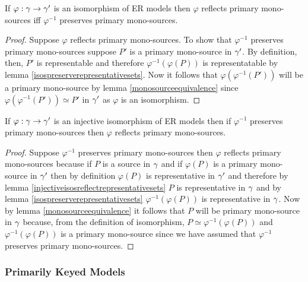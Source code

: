 \begin{lemma}
If $\varphi: \gamma \rightarrow \gamma'$ is an isomorphism of ER models  then
$\varphi$ reflects primary mono-sources iff $\varphi^{-1}$ preserves primary mono-sources.
\end{lemma}
\begin{proof}
Suppose $\varphi$ reflects primary mono-sources. To show that $\varphi^{-1}$ preserves primary mono-sources suppose
 $P'$ is a primary mono-source in $\gamma'$. By definition, then,  $P'$ is representable  and therefore $\varphi^{-1}(\varphi(P))$ is representatable 
by lemma \ref{isospreserverepresentativesets}.  Now it follows that  $\varphi(\varphi^{-1}(P'))$ will be a primary mono-source by lemma \ref{monosourceequivalence} since $\varphi(\varphi^{-1}(P')) \simeq P'$ in $\gamma'$ as $\varphi$ is an isomorphism. 
\end{proof}

\begin{lemma}
If $\varphi: \gamma \rightarrow \gamma'$ is an injective isomorphism of ER models  then
if $\varphi^{-1}$ preserves primary mono-sources
then $\varphi$ reflects primary mono-sources.
\end{lemma}
\begin{proof}
Suppose $\varphi^{-1}$ preserves primary mono-sources then $\varphi$ reflects primary mono-sources because
if $P$ is a source in $\gamma$ and if $\varphi(P)$ is a primary mono-source in $\gamma'$ then
by definition $\varphi(P)$ is representative in $\gamma'$ and therefore by lemma \ref{injectiveisosreflectrepresentativesets} 
$P$ is representative in $\gamma$ and by lemma \ref{isospreserverepresentativesets} $\varphi^{-1}(\varphi(P))$ is representative in $\gamma$.
Now by lemma \ref{monosourceequivalence} it follows that $P$ will be primary mono-source in $\gamma$ because, from the definition of
isomorphism,  $P \simeq \varphi^{-1}(\varphi(P))$ and $\varphi^{-1}(\varphi(P))$ is a primary mono-source since we have assumed
that  $\varphi^{-1}$ preserves primary mono-sources. 
\end{proof}


\subsubsection{Primarily Keyed Models}

